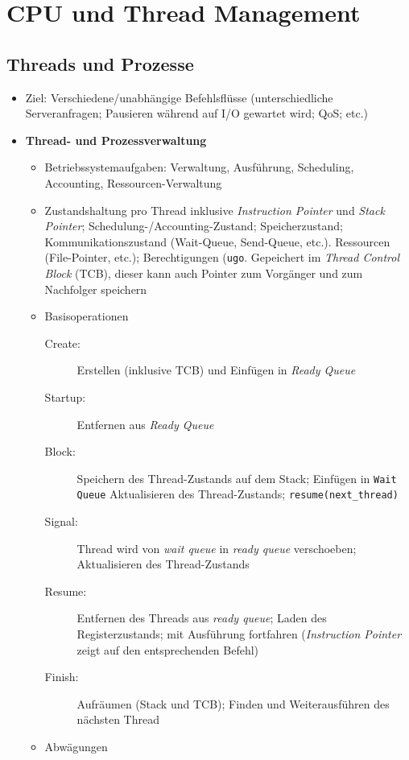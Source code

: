 \section{CPU und Thread Management}

\subsection{Threads und Prozesse}
\begin{itemize}
	\item Ziel: Verschiedene/unabhängige Befehlsflüsse (unterschiedliche Serveranfragen; Pausieren während auf I/O gewartet wird; QoS; etc.)
	\item \textbf{Thread- und Prozessverwaltung}
	\begin{itemize}
		\item Betriebssystemaufgaben: Verwaltung, Ausführung, Scheduling, Accounting, Ressourcen-Verwaltung
		\item Zustandshaltung pro Thread inklusive \textit{Instruction Pointer} und \textit{Stack Pointer}; Schedulung-/Accounting-Zustand; Speicherzustand; Kommunikationszustand (Wait-Queue, Send-Queue, etc.). Ressourcen (File-Pointer, etc.); Berechtigungen (\texttt{ugo}. Gepeichert im \textit{Thread Control Block} (TCB), dieser kann auch Pointer zum Vorgänger und zum Nachfolger speichern
		\item Basisoperationen %
		\begin{description}
			\item[Create:] Erstellen (inklusive TCB) und Einfügen in \textit{Ready Queue}
			\item[Startup:] Entfernen aus \textit{Ready Queue}
			\item[Block:] Speichern des Thread-Zustands auf dem Stack; Einfügen in \texttt{Wait Queue} Aktualisieren des Thread-Zustands; \texttt{resume(next\_thread)}
			\item[Signal:] Thread wird von \textit{wait queue} in \textit{ready queue} verschoeben; Aktualisieren des Thread-Zustands
			\item[Resume:] Entfernen des Threads aus \textit{ready queue}; Laden des Registerzustands; mit Ausführung fortfahren (\textit{Instruction Pointer} zeigt auf den entsprechenden Befehl)
			\item[Finish:] Aufräumen (Stack und TCB); Finden und Weiterausführen des nächsten Thread
		\end{description}
		\item Abwägungen
		\begin{itemize}

\end{itemize}
\end{itemize}
\end{itemize}
